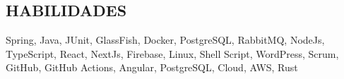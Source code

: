 \begin{framed}
    \section{HABILIDADES}
    Spring, Java, JUnit, GlassFish, Docker, PostgreSQL, RabbitMQ, NodeJs, TypeScript, React, NextJs, Firebase, Linux, Shell Script, WordPress, Scrum, GitHub, GitHub Actions, Angular, PostgreSQL, Cloud, AWS, Rust
  \end{framed}
